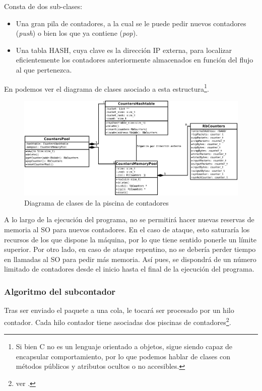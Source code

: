 Consta de dos sub-clases:
\begin{itemize}
 \item Una gran pila de contadores, a la cual se le puede pedir nuevos contadores (\emph{push}) o bien los que ya 
contiene (\emph{pop}).
 \item Una tabla HASH, cuya clave es la dirección IP externa, para localizar eficientemente los contadores 
anteriormente almacenados en función del flujo al que pertenezca.
\end{itemize}

En  podemos ver el diagrama de clases asociado a esta estructura\footnote{Si bien C no es un 
lenguaje orientado a objetos, sigue siendo capaz de encapsular comportamiento, por lo que podemos hablar de clases 
con métodos públicos y atributos ocultos o no accesibles.}.


\begin{figure}[htbp]
\centering
\includegraphics[width=\textwidth]{CapituloEstructura/Figuras/DiagramaClasesContadores-crop}
\caption{Diagrama de clases de la piscina de contadores}
\end{figure}
%

A lo largo de la ejecución del programa, no se permitirá hacer nuevas reservas de memoria al \gls{SO} para 
nuevos contadores. En el caso de ataque, esto saturaría los recursos de los que dispone la máquina, por lo que tiene 
sentido ponerle un límite superior. Por otro lado, en caso de ataque repentino, no se debería perder tiempo en llamadas 
al \gls{SO} para pedir más memoria. Así pues, se dispondrá de un número limitado de contadores desde el inicio hasta el 
final de la ejecución del programa.

\subsubsection{Algoritmo del subcontador}
Tras ser enviado el paquete a una cola, le tocará ser procesado por un hilo contador. Cada hilo contador tiene 
asociadas dos piscinas de contadores\footnote{ver .}. 

